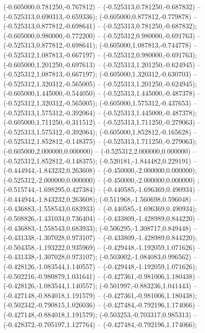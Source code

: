  (-0.605000,0.781250,-0.767812) -- (-0.525313,0.781250,-0.687832) -- (-0.525313,0.690313,-0.659336);
 (-0.605000,0.877812,-0.779878) -- (-0.525313,0.877812,-0.698641) -- (-0.525313,0.781250,-0.687832);
 (-0.605000,0.980000,-0.772200) -- (-0.525312,0.980000,-0.691763) -- (-0.525313,0.877812,-0.698641);
 (-0.605000,1.087813,-0.744778) -- (-0.525312,1.087813,-0.667197) -- (-0.525312,0.980000,-0.691763);
 (-0.605000,1.201250,-0.697613) -- (-0.525313,1.201250,-0.624945) -- (-0.525312,1.087813,-0.667197);
 (-0.605000,1.320312,-0.630703) -- (-0.525312,1.320312,-0.565005) -- (-0.525313,1.201250,-0.624945);
 (-0.605000,1.445000,-0.544050) -- (-0.525313,1.445000,-0.487378) -- (-0.525312,1.320312,-0.565005);
 (-0.605000,1.575312,-0.437653) -- (-0.525313,1.575312,-0.392064) -- (-0.525313,1.445000,-0.487378);
 (-0.605000,1.711250,-0.311512) -- (-0.525313,1.711250,-0.279063) -- (-0.525313,1.575312,-0.392064);
 (-0.605000,1.852812,-0.165628) -- (-0.525312,1.852812,-0.148375) -- (-0.525313,1.711250,-0.279063);
 (-0.605000,2.000000,0.000000) -- (-0.525312,2.000000,0.000000) -- (-0.525312,1.852812,-0.148375);
 (-0.520181,-1.844482,0.229191) -- (-0.444944,-1.843232,0.263608) -- (-0.450000,-2.000000,0.000000);
 (-0.525312,-2.000000,0.000000) -- (-0.450000,-2.000000,0.000000) ;
 (-0.515744,-1.698295,0.427384) -- (-0.440585,-1.696369,0.490934) -- (-0.444944,-1.843232,0.263608);
 (-0.511968,-1.560698,0.596048) -- (-0.436883,-1.558543,0.683933) -- (-0.440585,-1.696369,0.490934);
 (-0.508826,-1.431034,0.736404) -- (-0.433809,-1.428989,0.844220) -- (-0.436883,-1.558543,0.683933);
 (-0.506295,-1.308717,0.849448) -- (-0.431338,-1.307028,0.973107) -- (-0.433809,-1.428989,0.844220);
 (-0.504358,-1.193222,0.935969) -- (-0.429448,-1.192059,1.071626) -- (-0.431338,-1.307028,0.973107);
 (-0.503002,-1.084083,0.996562) -- (-0.428126,-1.083544,1.140557) -- (-0.429448,-1.192059,1.071626);
 (-0.502216,-0.980879,1.031641) -- (-0.427361,-0.981006,1.180438) -- (-0.428126,-1.083544,1.140557);
 (-0.501997,-0.883236,1.041443) -- (-0.427148,-0.884018,1.191579) -- (-0.427361,-0.981006,1.180438);
 (-0.502342,-0.790815,1.026036) -- (-0.427484,-0.792196,1.174066) -- (-0.427148,-0.884018,1.191579);
 (-0.503253,-0.703317,0.985313) -- (-0.428372,-0.705197,1.127764) -- (-0.427484,-0.792196,1.174066);
